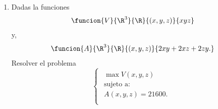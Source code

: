 \documentclass[a4,11pt]{aleph-examen}
\begin{document}
\begin{preguntas}
\begin{respuesta}
\begin{respuesta}
\begin{respuesta}
\begin{enumerate}
\begin{respuesta}
\[\begin{pmatrix}
            0 & 0 & 0 & 2 & 1 \\
            -2 & 0 & 1 & 1 & 0 \\
            2 & 2 & 1 & 1 & 0 \\
            0 & 1 & 0 & 0 & 0
        \end{pmatrix},        
    \]
    \[
        H_L(a_3)=
        \begin{pmatrix}
            0 & 0 & 2 & -2 & 0 \\
            0 & 0 & 0 & -2 & -1 \\
            2 & 0 & 1 & 1 & 0 \\
            -2 & -2 & 1 & 1 & 0 \\
            0 & -1 & 0 & 0 & 0
        \end{pmatrix},        
    \]
    y
    \[
        H_L(a_4)=
        \begin{pmatrix}
            0 & 0 & 2 & 2 & 0 \\
            0 & 0 & 0 & 2 & 1 \\
            2 & 0 & -1 & 1 & 0 \\
            2 & 2 & 1 & -1 & 0 \\
            0 & 1 & 0 & 0 & 0
        \end{pmatrix}.        
    \]
    Nótese que en este caso $m=2$ y $n=3$ entonces para cada punto crítico se busca el valor de $(-1)^m\det(H_{2m+1})$, se tiene
    \begin{align*}
        \det H_{L_5}(a_1)=-16,\\
        \det H_{L_5}(a_2)=16,\\
        \det H_{L_5}(a_3)=16,\\
        \det H_{L_5}(a_4)=-16.
    \end{align*}
    Analizando la secuencia de gradientes para cada punto crítico, se puede ver que en los puntos $a_1$ y $a_4$ se tiene un máximo de valor 3 y en los puntos $a_2$ y $a_3$ se tiene un mínimo de valor 1.
\end{respuesta}
    
\item
    Dadas la funciones
    \[
         \funcion{V}{\R^3}{\R}{(x,y,z)}{xyz}
    \]
  	y,
	\[
        \funcion{A}{\R^3}{\R}{(x,y,z)}{2xy+2xz+2zy.}
    \] 
    Resolver el problema 
    \[
        \begin{cases}
        \begin{array}{c}
		\max V(x,y,z)\\
		\text{sujeto  a:}\\
			A(x,y,z)=21600.\\		
		\end{array}
        \end{cases} 
    \]


\end{enumerate}
\end{respuesta}
\end{respuesta}
\end{respuesta}
\end{preguntas}
\end{document}
